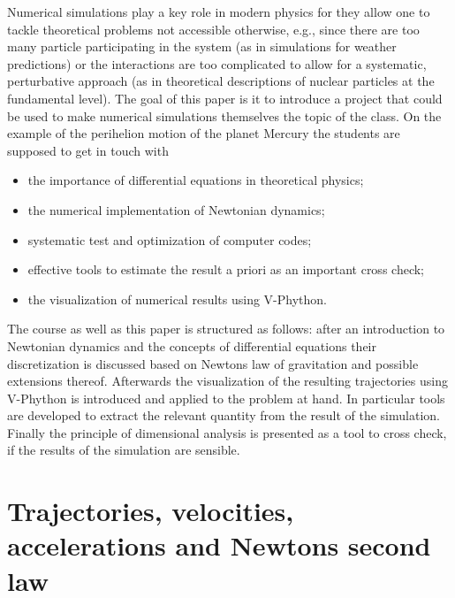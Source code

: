 \documentclass[12pt]{iopart}
\begin{document}
Numerical simulations play a key role in modern physics for they allow one to tackle theoretical problems
not accessible otherwise, e.g., since there are too many particle participating in the system (as in
simulations for weather predictions) or the interactions are too complicated to allow for a systematic,
perturbative approach (as in theoretical descriptions of nuclear particles at the fundamental level). 
 The goal of this paper is it to
introduce a project that could be used to make numerical simulations themselves the topic of the class.
On the example of the perihelion motion of the planet Mercury the students are supposed to get in touch with
\begin{itemize}
\item the importance of differential equations in theoretical physics;
\item the numerical implementation of Newtonian dynamics;
\item systematic test and optimization of computer codes;
\item effective tools to estimate the result a priori as an important cross check;
\item the visualization of numerical results using V-Phython.
\end{itemize}
The course as well as this paper is structured as follows: after an introduction to Newtonian dynamics and the 
concepts of differential equations their discretization is discussed based on Newtons law of gravitation and possible
extensions thereof. Afterwards the visualization of the resulting trajectories using V-Phython is introduced and
applied to the problem at hand. In particular tools are developed to extract the relevant quantity from the result
of the simulation.
Finally the principle of dimensional analysis is presented as a tool to cross check, if the results of the simulation
are sensible.

\section{Trajectories, velocities, accelerations and Newtons second law}
\label{sec:tva}
\end{document}
